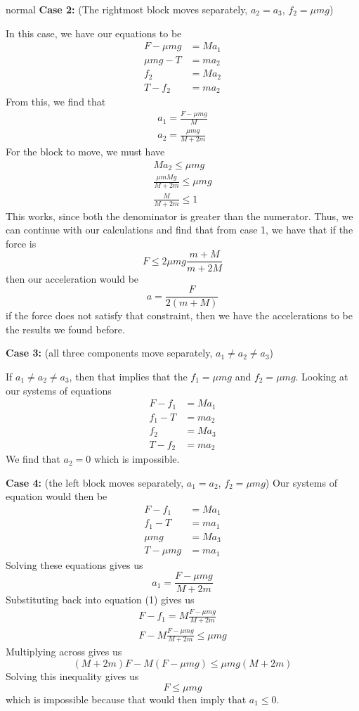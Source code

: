 \begin{solution}{normal}
\textbf{Case 2:} (The rightmost block moves separately, $a_2 = a_3$, $f_2 = \mu mg$)
\vspace{2mm}

In this case, we have our equations to be 
\begin{align}
F - \mu mg &= Ma_1\\
\mu mg - T &= ma_2\\
f_2 &= Ma_2\\
T - f_2 &= ma_2
\end{align}
From this, we find that 
\begin{align*}
\boxed{a_1 = \frac{F - \mu mg}{M}}\\
\boxed{a_2 = \frac{\mu mg}{M + 2m}}
\end{align*}
For the block to move, we must have 
\begin{align*}
Ma_2 \leq \mu mg\\
\frac{\mu mMg}{M + 2m} \leq \mu mg\\
\frac{M}{M + 2m} \leq 1
\end{align*}
This works, since both the denominator is greater than the numerator. Thus, we can continue with our calculations and find that from case 1, we have that if the force is 
\[F \leq 2\mu mg \frac{m +M}{m + 2M}\]
then our acceleration would be
\[\boxed{a = \frac{F}{2(m + M)}}\]
if the force does not satisfy that constraint, then we have the accelerations to be the results we found before. 
\vspace{2mm}

\textbf{Case 3:} (all three components move separately, $a_1 \neq a_2 \neq a_3$)
\vspace{2mm}

If $a_1\neq a_2 \neq a_3$, then that implies that the $f_1 = \mu mg$ and $f_2 = \mu mg$. Looking at our systems of equations 
\begin{align}
F - f_1 &= Ma_1\\
f_1 - T &= ma_2\\
f_2 &= Ma_3\\
T - f_2 &= ma_2
\end{align}
We find that $a_2 = 0$ which is impossible.
\vspace{2mm}

\textbf{Case 4:} (the left block moves separately, $a_1 = a_2$, $f_2 = \mu mg$)
Our systems of equation would then be 
\begin{align}
F - f_1 &= Ma_1\\
f_1 - T &= ma_1\\
\mu mg &= Ma_3\\
T - \mu mg &= ma_1
\end{align}
Solving these equations gives us 
\[a_1 = \frac{F - \mu mg}{M + 2m}\]
Substituting back into equation (1) gives us 
\begin{align*}
F - f_1 = M\frac{F - \mu mg}{M + 2m}\\
F - M\frac{F - \mu mg}{M + 2m} \leq \mu mg
\end{align*}
Multiplying across gives us
\[(M + 2m)F - M(F -\mu mg) \leq \mu mg (M + 2m)\]
Solving this inequality gives us
\[F \leq \mu mg\]
which is impossible because that would then imply that $a_1 \leq 0$.
\end{solution}
